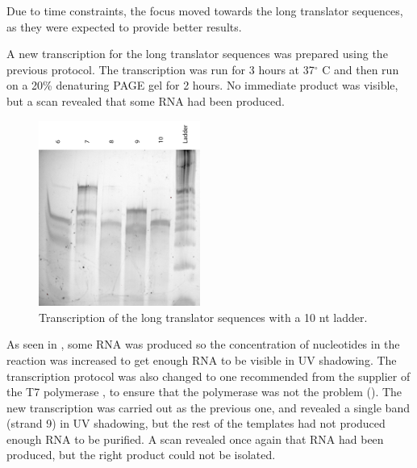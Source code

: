 Due to time constraints, the focus moved towards the long translator sequences, as they were expected to provide better results.

A new transcription for the long translator sequences was prepared using the previous protocol. The transcription was run for 3 hours at 37$^\circ$ C and then run on a 20\% denaturing PAGE gel for 2 hours. No immediate product was visible, but a scan revealed that some RNA had been produced.

\begin{figure}
\centering
\includegraphics[width=150pt]{images/translator_transcription_long_1.png}
\caption{Transcription of the long translator sequences with a 10 nt ladder.}
\label{translator_transcription_long_1}
\end{figure}

As seen in , some RNA was produced so the concentration of nucleotides in the reaction was increased to get enough RNA to be visible in UV shadowing. The transcription protocol was also changed to one recommended from the supplier of the T7 polymerase \cite{nebtranscription}, to ensure that the polymerase was not the problem (). The new transcription was carried out as the previous one, and revealed a single band (strand 9) in UV shadowing, but the rest of the templates had not produced enough RNA to be purified. A scan revealed once again that RNA had been produced, but the right product could not be isolated.

